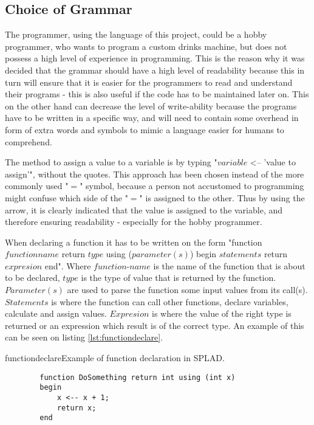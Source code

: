 \subsection{Choice of Grammar}
\label{sec:grammarchoice}
The programmer, using the language of this project, could be a hobby programmer, who wants to program a custom drinks machine, but does not possess a high level of experience in programming. This is the reason why it was decided that the grammar should have a high level of readability because this in turn will ensure that it is easier for the programmers to read and understand their programs - this is also useful if the code has to be maintained later on. This on the other hand can decrease the level of write-ability because the programs have to be written in a specific way, and will need to contain some overhead in form of extra words and symbols to mimic a language easier for humans to comprehend.

The method to assign a value to a variable is by typing "$variable$ <-- 'value to assign'", without the quotes. This approach has been chosen instead of the more commonly used "$=$" symbol, because a person not accustomed to programming might confuse which side of the "$=$" is assigned to the other. Thus by using the arrow, it is clearly indicated that the value is assigned to the variable, and therefore ensuring readability - especially for the hobby programmer.

When declaring a function it has to be written on the form "function $functionname$ return $type$ using ($parameter(s)$) begin $statements$ return $expresion$ end". Where $function$-$name$ is the name of the function that is about to be declared, $type$ is the type of value that is returned by the function. $Parameter(s)$ are used to parse the function some input values from its call(s). $Statements$ is where the function can call other functions, declare variables, calculate and assign values. $Expresion$ is where the value of the right type is returned or an expression which result is of the correct type.
An example of this can be seen on listing \ref{lst:functiondeclare}.

\begin{code}{functiondeclare}{Example of function declaration in SPLAD.}
	\begin{lstlisting}
		function DoSomething return int using (int x)
		begin
			x <-- x + 1;
			return x;
		end
	\end{lstlisting}
\end{code}

